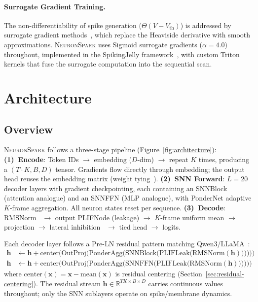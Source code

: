 \documentclass{article}
\newcommand{\model}{\textsc{NeuronSpark}}
\newcommand{\vth}{V_{\text{th}}}
\newcommand{\R}{\mathbb{R}}
\begin{document}
\paragraph{Surrogate Gradient Training.}
The non-differentiability of spike generation ($\Theta(V - \vth)$) is addressed by surrogate gradient methods~\citep{neftci2019surrogate, zenke2021remarkable}, which replace the Heaviside derivative with smooth approximations.
\model{} uses Sigmoid surrogate gradients ($\alpha=4.0$) throughout, implemented in the SpikingJelly framework~\citep{fang2023spikingjelly}, with custom Triton kernels that fuse the surrogate computation into the sequential scan.

\section{Architecture}
\label{sec:arch}

\subsection{Overview}
\label{sec:overview}

\model{} follows a three-stage pipeline (Figure~\ref{fig:architecture}):
\textbf{(1)~Encode}: Token IDs $\to$ embedding ($D$-dim) $\to$ repeat $K$ times, producing a $(T{\cdot}K, B, D)$ tensor. Gradients flow directly through embedding; the output head reuses the embedding matrix (weight tying~\citep{press2017using}).
\textbf{(2)~SNN Forward}: $L{=}20$ decoder layers with gradient checkpointing, each containing an SNNBlock (attention analogue) and an SNNFFN (MLP analogue), with PonderNet adaptive $K$-frame aggregation. All neuron states reset per sequence.
\textbf{(3)~Decode}: RMSNorm~\citep{zhang2019root} $\to$ output PLIFNode (leakage) $\to$ $K$-frame uniform mean $\to$ projection $\to$ lateral inhibition~\citep{carandini2012normalization} $\to$ tied head $\to$ logits.

Each decoder layer follows a Pre-LN residual pattern matching Qwen3/LLaMA~\citep{touvron2023llama, yang2025qwen3}:
\begin{align}
    \mathbf{h} &\leftarrow \mathbf{h} + \text{center}\big(\text{OutProj}\big(\text{PonderAgg}\big(\text{SNNBlock}\big(\text{PLIFLeak}\big(\text{RMSNorm}(\mathbf{h})\big)\big)\big)\big)\big) \label{eq:layer-block} \\
    \mathbf{h} &\leftarrow \mathbf{h} + \text{center}\big(\text{OutProj}\big(\text{PonderAgg}\big(\text{SNNFFN}\big(\text{PLIFLeak}\big(\text{RMSNorm}(\mathbf{h})\big)\big)\big)\big)\big) \label{eq:layer-ffn}
\end{align}
where $\text{center}(\mathbf{x}) = \mathbf{x} - \text{mean}(\mathbf{x})$ is residual centering (Section~\ref{sec:residual-centering}).
The residual stream $\mathbf{h} \in \R^{TK \times B \times D}$ carries continuous values throughout; only the SNN sublayers operate on spike/membrane dynamics.
\end{document}
